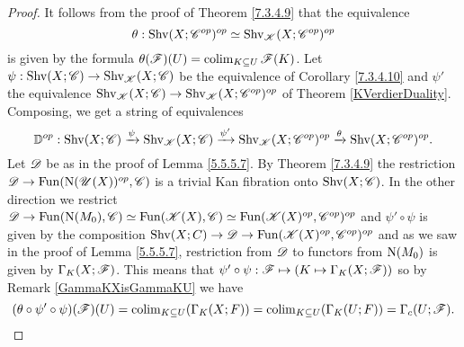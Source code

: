 \documentclass[../../thesis.tex]{subfiles}
\begin{document}
\begin{proof}
    It follows from the proof of Theorem \ref{7.3.4.9} that the equivalence
    \[
        \theta: \mathrm{Shv}(X;\mathscr{C}^{op})^{op} \simeq \mathrm{Shv}_{\mathscr{K}}(X;\mathscr{C}^{op})^{op}
    \]
    is given by the formula $\theta(\mathscr{F})(U) = \operatorname{colim}_{K\subseteq U}\mathscr{F}(K)$.
    Let $\psi: \mathrm{Shv}(X;\mathscr{C}) \to \mathrm{Shv}_{\mathscr{K}}(X;\mathscr{C})$ be the equivalence of Corollary \ref{7.3.4.10} and $\psi'$ the equivalence $\mathrm{Shv}_{\mathscr{K}}(X;\mathscr{C}) \to \mathrm{Shv}_{\mathscr{K}}(X;\mathscr{C}^{op})^{op}$ of Theorem \ref{KVerdierDuality}.
    Composing, we get a string of equivalences
    \[
        \mathbb{D}^{op} : \mathrm{Shv}(X;\mathscr{C}) \xrightarrow{\psi} \mathrm{Shv}_{\mathscr{K}}(X;\mathscr{C}) \xrightarrow{\psi'} \mathrm{Shv}_{\mathscr{K}}(X;\mathscr{C}^{op})^{op} \xrightarrow{\theta} \mathrm{Shv}(X;\mathscr{C}^{op})^{op}.
    \]
    Let $\mathscr{D}$ be as in the proof of Lemma \ref{5.5.5.7}.
    By Theorem \ref{7.3.4.9} the restriction $\mathscr{D}\to \mathrm{Fun}(\mathrm{N}(\mathscr{U}(X))^{op}, \mathscr{C})$ is a trivial Kan fibration onto $\mathrm{Shv}(X;\mathscr{C})$.
    In the other direction we restrict $\mathscr{D} \to \mathrm{Fun}(\mathrm{N}(M_0), \mathscr{C}) \simeq \mathrm{Fun}(\mathscr{K}(X), \mathscr{C}) \simeq \mathrm{Fun}(\mathscr{K}(X)^{op}, \mathscr{C}^{op})^{op}$ and $\psi' \circ \psi$ is given by the composition $\mathrm{Shv}(X;C) \to \mathscr{D} \to \mathrm{Fun}(\mathscr{K}(X)^{op}, \mathscr{C}^{op})^{op}$ and as we saw in the proof of Lemma \ref{5.5.5.7}, restriction from $\mathscr{D}$ to functors from $\mathrm{N}(M_0)$ is given by $\Gamma_K(X;\mathscr{F})$.
    This means that $\psi' \circ \psi : \mathscr{F} \mapsto \left( K \mapsto \Gamma_K(X;\mathscr{F}) \right)$ so by Remark \ref{GammaKXisGammaKU} we have
    \[
        (\theta \circ \psi' \circ \psi)(\mathscr{F})(U) = \operatorname{colim}_{K\subseteq U}(\Gamma_K(X;F)) = \operatorname{colim}_{K\subseteq U}(\Gamma_K(U;F)) = \Gamma_c(U;\mathscr{F}).
    \]
\end{proof}
\end{document}
